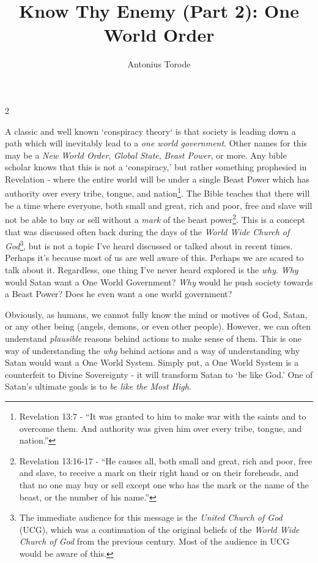 \documentclass[10pt]{article}
\title{Know Thy Enemy (Part 2): One World Order}
\author{Antonius Torode}
\begin{document}
\maketitle
\thispagestyle{fancy}



\begin{multicols}{2}

A classic and well known `conspiracy theory` is that society is leading down a path which will inevitably lead to a \textit{one world government}. Other names for this may be a \textit{New World Order}, \textit{Global State}, \textit{Beast Power}, or more. Any bible scholar knows that this is not a `conspiracy,' but rather something prophesied in Revelation - where the entire world will be under a single Beast Power which has authority over every tribe, tongue, and nation\footnote{Revelation 13:7 - ``It was granted to him to make war with the saints and to overcome them. And authority was given him over every tribe, tongue, and nation.''}. The Bible teaches that there will be a time where everyone, both small and great, rich and poor, free and slave will not be able to buy or sell without a \textit{mark} of the beast power\footnote{Revelation 13:16-17 - ``He causes all, both small and great, rich and poor, free and slave, to receive a mark on their right hand or on their foreheads, and that no one may buy or sell except one who has the mark or the name of the beast, or the number of his name.''}. This is a concept that was discussed often back during the days of the \textit{World Wide Church of God}\footnote{The immediate audience for this message is the \textit{United Church of God} (UCG), which was a continuation of the original beliefs of the \textit{World Wide Church of God} from the previous century. Most of the audience in UCG would be aware of this.}, but is not a topic I've heard discussed or talked about in recent times. Perhaps it's because most of us are well aware of this. Perhaps we are scared to talk about it. Regardless, one thing I've never heard explored is the \textit{why}. \textit{Why} would Satan want a One World Government? \textit{Why} would he push society towards a Beast Power? Does he even want a one world government?

Obviously, as humans, we cannot fully know the mind or motives of God, Satan, or any other being (angels, demons, or even other people). However, we can often understand \textit{plausible} reasons behind actions to make sense of them. This is one way of understanding the \textit{why} behind actions and a way of understanding why Satan would want a One World System. Simply put, a One World System is a counterfeit to Divine Sovereignty - it will transform Satan to `be like God.' One of Satan's ultimate goals is to \textit{be like the Most High}.


\end{multicols}
\end{document}
